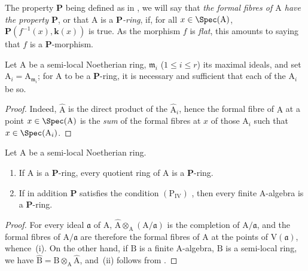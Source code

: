 
The property $\boldsymbol{P}$ being defined as in , we will say that \emph{the formal fibres of $\mathrm{A}$ have the property $\boldsymbol{P}$}, or that $\mathrm{A}$ is a \emph{$\boldsymbol{P}$-ring}, if, for all $x\in\Spec(\mathrm{A})$, $\boldsymbol{P}(f^{-1}(x),\boldsymbol{k}(x))$ is true.
As the morphism $f$ is \emph{flat}, this amounts to saying that $f$ is a $\boldsymbol{P}$-morphism.

\begin{proposition}[7.3.14]
\label{IV.7.3.14}
Let $\mathrm{A}$ be a semi-local Noetherian ring, $\mathfrak{m}_i$ ($1\leqslant i\leqslant r$) its maximal ideals, and set $\mathrm{A}_i=\mathrm{A}_{\mathfrak{m}_i}$; for $\mathrm{A}$ to be a $\boldsymbol{P}$-ring, it is necessary and sufficient that each of the $\mathrm{A}_i$ be so.
\end{proposition}

\begin{proof}
Indeed, $\widehat{\mathrm{A}}$ is the direct product of the $\widehat{\mathrm{A}}_i$, hence the formal fibre of $\mathrm{A}$ at a point $x\in\Spec(\mathrm{A})$ is the \emph{sum} of the formal fibres at $x$ of those $\mathrm{A}_i$ such that $x\in\Spec(\mathrm{A}_i)$.
\end{proof}

\begin{proposition}[7.3.15]
\label{IV.7.3.15}
Let $\mathrm{A}$ be a semi-local Noetherian ring.
\begin{enumerate}[label=\emph{\roman*)}]
  \item If $\mathrm{A}$ is a $\boldsymbol{P}$-ring, every quotient ring of $\mathrm{A}$ is a $\boldsymbol{P}$-ring.
  \item If in addition $\boldsymbol{P}$ satisfies the condition $(\mathrm{P_{IV}})$ , then every finite A-algebra is a $\boldsymbol{P}$-ring.
\end{enumerate}
\end{proposition}

\begin{proof}
For every ideal $\mathfrak{a}$ of $\mathrm{A}$, $\widehat{\mathrm{A}}\otimes_\mathrm{A}(\mathrm{A}/\mathfrak{a})$ is the completion of $\mathrm{A}/\mathfrak{a}$, and the formal fibres of $\mathrm{A}/\mathfrak{a}$ are therefore the formal fibres of $\mathrm{A}$ at the points of $\mathrm{V}(\mathfrak{a})$, whence~(i).
On the other hand, if $\mathrm{B}$ is a finite $\mathrm{A}$-algebra, $\mathrm{B}$ is a semi-local ring, we have $\widehat{\mathrm{B}}=\mathrm{B}\otimes_\mathrm{A}\widehat{\mathrm{A}}$, and~(ii) follows from .
\end{proof}

